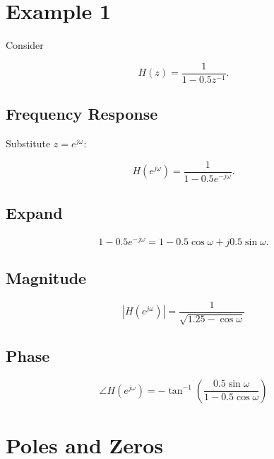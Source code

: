 \section{Example 1}

Consider

\[
H(z)=
\frac{1}{1-0.5z^{-1}}.
\]


\subsection{Frequency Response}

Substitute \(z=e^{j\omega}\):

\[
H(e^{j\omega})=
\frac{1}{1-0.5e^{-j\omega}}.
\]


\subsection{Expand}

\[
1-0.5e^{-j\omega}
=
1-0.5\cos\omega+j0.5\sin\omega.
\]


\subsection{Magnitude}

\[
\boxed{
|H(e^{j\omega})|=
\frac{1}
{\sqrt{1.25-\cos\omega}}
}
\]


\subsection{Phase}

\[
\boxed{
\angle H(e^{j\omega})=
-\tan^{-1}
\left(
\frac{0.5\sin\omega}{1-0.5\cos\omega}
\right)
}
\]


\section{Poles and Zeros}


